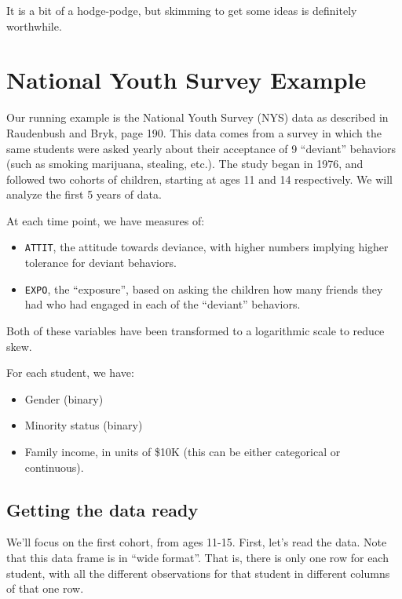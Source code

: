 \documentclass[
  letterpaper,
  DIV=11,
  numbers=noendperiod]{scrreprt}
\providecommand{\tightlist}{%
  \setlength{\itemsep}{0pt}\setlength{\parskip}{0pt}}\usepackage{longtable,booktabs,array}
\begin{document}
It is a bit of a hodge-podge, but skimming to get some ideas is
definitely worthwhile.

\hypertarget{national-youth-survey-example}{%
\section{National Youth Survey
Example}\label{national-youth-survey-example}}

Our running example is the National Youth Survey (NYS) data as described
in Raudenbush and Bryk, page 190. This data comes from a survey in which
the same students were asked yearly about their acceptance of 9
``deviant'' behaviors (such as smoking marijuana, stealing, etc.). The
study began in 1976, and followed two cohorts of children, starting at
ages 11 and 14 respectively. We will analyze the first 5 years of data.

At each time point, we have measures of:

\begin{itemize}
\tightlist
\item
  \texttt{ATTIT}, the attitude towards deviance, with higher numbers
  implying higher tolerance for deviant behaviors.
\item
  \texttt{EXPO}, the ``exposure'', based on asking the children how many
  friends they had who had engaged in each of the ``deviant'' behaviors.
\end{itemize}

Both of these variables have been transformed to a logarithmic scale to
reduce skew.

For each student, we have:

\begin{itemize}
\tightlist
\item
  Gender (binary)
\item
  Minority status (binary)
\item
  Family income, in units of \$10K (this can be either categorical or
  continuous).
\end{itemize}

\hypertarget{getting-the-data-ready}{%
\subsection{Getting the data ready}\label{getting-the-data-ready}}

We'll focus on the first cohort, from ages 11-15. First, let's read the
data. Note that this data frame is in ``wide format''. That is, there is
only one row for each student, with all the different observations for
that student in different columns of that one row.
\end{document}
